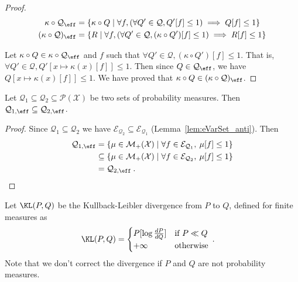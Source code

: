 \begin{proof}
  \begin{align*}
    \kappa \circ \mathcal{Q}_{\eff}
    &= \{\kappa \circ Q \mid \forall f, (\forall Q' \in \mathcal{Q}, Q'[f] \le 1) \implies Q[f] \le 1\}
    \\
    (\kappa \circ \mathcal{Q})_{\eff}
    &= \{R \mid \forall f, (\forall Q' \in \mathcal{Q}, (\kappa \circ Q')[f] \le 1) \implies R[f] \le 1\}
  \end{align*}

  Let $\kappa \circ Q \in \kappa \circ \mathcal{Q}_{\eff}$ and $f$ such that $\forall Q' \in \mathcal{Q}, (\kappa \circ Q')[f] \le 1$. That is, $\forall Q' \in \mathcal{Q}, Q'[x \mapsto \kappa(x)[f]] \le 1$.
  Then since $Q \in \mathcal{Q}_{\eff}$, we have $Q[x \mapsto \kappa(x)[f]] \le 1$.
  We have proved that $\kappa \circ Q \in (\kappa \circ \mathcal{Q})_{\eff}$.
\end{proof}


\begin{lemma}\label{lem:effectiveSet_mono}
Let $\mathcal{Q}_1 \subseteq \mathcal{Q}_2 \subseteq \mathcal{P}(\mathcal{X})$ be two sets of probability measures.
Then $\mathcal{Q}_{1, \eff} \subseteq \mathcal{Q}_{2, \eff}$.
\end{lemma}

\begin{proof}
Since $\mathcal{Q}_1 \subseteq \mathcal{Q}_2$ we have $\mathcal{E}_{\mathcal{Q}_2} \subseteq \mathcal{E}_{\mathcal{Q}_1}$ (Lemma~\ref{lem:eVarSet_anti}).
Then
\begin{align*}
  \mathcal{Q}_{1, \eff}
  &= \{\mu \in \mathcal{M}_+(\mathcal{X}) \mid \forall f \in \mathcal{E}_{\mathcal{Q}_1}, \: \mu[f] \le 1\}
  \\
  &\subseteq \{\mu \in \mathcal{M}_+(\mathcal{X}) \mid \forall f \in \mathcal{E}_{\mathcal{Q}_2}, \: \mu[f] \le 1\}
  \\
  &= \mathcal{Q}_{2, \eff}
  \: .
\end{align*}
\end{proof}

Let $\KL(P, Q)$ be the Kullback-Leibler divergence from $P$ to $Q$, defined for finite measures as
\begin{align*}
  \KL(P, Q)
  &= \begin{cases}
    P[\log \frac{dP}{dQ}] & \text{if } P \ll Q \\
    +\infty & \text{otherwise}
  \end{cases}
  \: .
\end{align*}
Note that we don't correct the divergence if $P$ and $Q$ are not probability measures.


